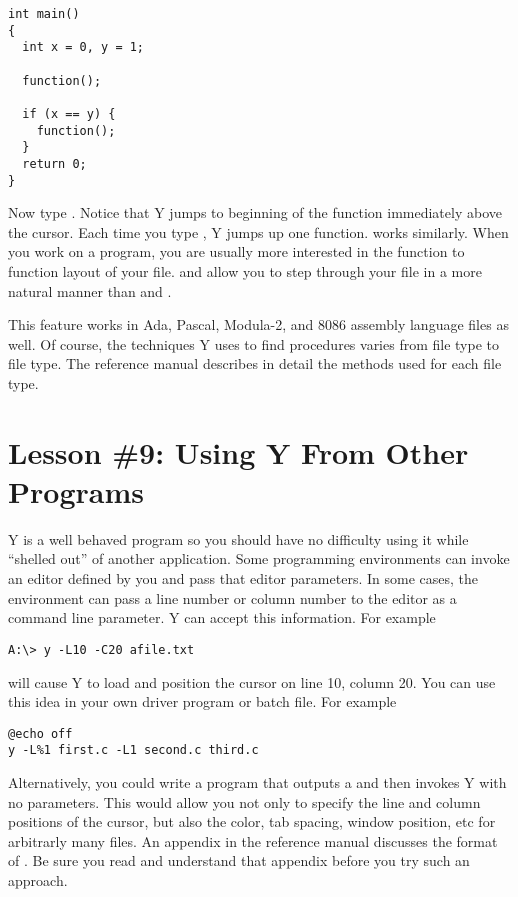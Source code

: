 \begin{verbatim}
int main()
{
  int x = 0, y = 1;

  function();

  if (x == y) {
    function();
  }
  return 0;
}
\end{verbatim}

Now type . Notice that Y jumps to beginning of the function immediately above
the cursor. Each time you type , Y jumps up one function. 
works similarly. When you work on a program, you are usually more interested in the function to
function layout of your file.  and  allow you to step through
your file in a more natural manner than  and .

This feature works in Ada, Pascal, Modula-2, and 8086 assembly language files as well. Of
course, the techniques Y uses to find procedures varies from file type to file type. The
reference manual describes in detail the methods used for each file type.

\section{Lesson \#9: Using Y From Other Programs}

Y is a well behaved program so you should have no difficulty using it while ``shelled out'' of
another application. Some programming environments can invoke an editor defined by you and pass
that editor parameters. In some cases, the environment can pass a line number or column number
to the editor as a command line parameter. Y can accept this information. For example

\begin{verbatim}
A:\> y -L10 -C20 afile.txt
\end{verbatim}

will cause Y to load  and position the cursor on line 10, column 20. You can
use this idea in your own driver program or batch file. For example

\begin{verbatim}
@echo off
y -L%1 first.c -L1 second.c third.c
\end{verbatim}

Alternatively, you could write a program that outputs a  and then invokes
Y with no parameters. This would allow you not only to specify the line and column positions of
the cursor, but also the color, tab spacing, window position, etc for arbitrarly many files. An
appendix in the reference manual discusses the format of . Be sure you
read and understand that appendix before you try such an approach.

